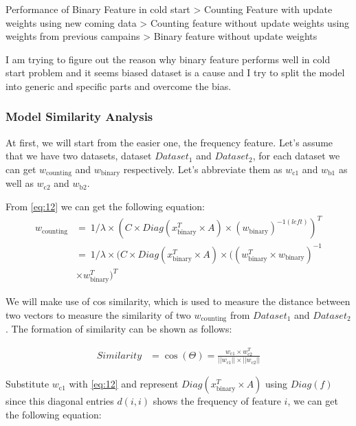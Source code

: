 \documentclass{sig-alternate}
\begin{document}
Performance of Binary Feature in cold start > Counting Feature with update weights using new coming data > Counting feature without update weights using weights from previous campains > Binary feature without update weights


I am trying to figure out the reason why binary feature performs well in cold start problem and it seems biased dataset is a cause and I try to split the model into generic and specific parts and overcome the bias.
\subsubsection{Model Similarity Analysis}
At first, we will start from the easier one, the frequency feature. Let's assume that we have two datasets, dataset \(Dataset_{\text{1}}\) and \(Dataset_{\text{2}}\), for each dataset we can get \(w_{\text{counting}}\) and \(w_{\text{binary}}\) respectively. Let's abbreviate them as \(w_{\text{c1}}\) and \(w_{\text{b1}}\) as well as \(w_{\text{c2}}\) and \(w_{\text{b2}}\). 

From \ref{eq:12} we can get the following equation:
\begin{equation} \label{eq:28}
\begin{split}
w_{\text{counting}} & =\ 1/{\lambda} \times (C \times Diag(x_{\text{binary}}^T \times A) \times (w_{\text{binary}})^{-1(left)})^T \\
& = \ 1/{\lambda} \times (C \times Diag(x_{\text{binary}}^T \times A) \times ((w_{\text{binary}}^T \times w_{\text{binary}})^{-1} \\
& \times w_{\text{binary}}^T )^T
\end{split}
\end{equation}

We will make use of cos similarity, which is used to measure the distance between two vectors to measure the similarity of two \(w_{\text{counting}}\) from \(Dataset_{\text{1}}\) and \(Dataset_{\text{2}}\). The formation of similarity can be shown as follows:

\begin{equation} \label{29} 
\begin{split}
Similarity & = \cos(\Theta) = \frac{w_{\text{c1}} \times w_{\text{c2}}^T} {||w_{\text{c1}}|| \times ||w_{\text{c2}}|| }
\end{split}
\end{equation}

Substitute \(w_{\text{c1}}\) with \ref{eq:12} and represent \(Diag(x_{\text{binary}}^T \times A)\) using \(Diag(f)\) since this diagonal entries \(d(i,i) \) shows the frequency of feature \(i\), we can get the following equation:
\end{document}
